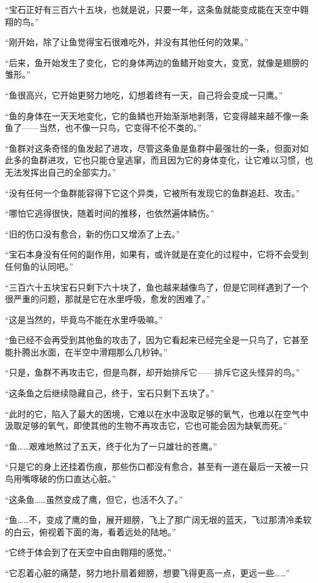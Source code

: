 “宝石正好有三百六十五块，也就是说，只要一年，这条鱼就能变成能在天空中翱翔的鸟。”

“刚开始，除了让鱼觉得宝石很难吃外，并没有其他任何的效果。”

“后来，鱼开始发生了变化，它的身体两边的鱼鳍开始变大，变宽，就像是翅膀的雏形。”

“鱼很高兴，它开始更努力地吃，幻想着终有一天，自己将会变成一只鹰。”

“鱼的身体在一天天地变化，它的鱼鳞也开始渐渐地剥落，它变得越来越不像一条鱼了——当然，也不像一只鸟，它变得不伦不类的。”

“鱼群对这条奇怪的鱼发起了进攻，尽管这条鱼是鱼群中最强壮的一条，但面对如此多的鱼群进攻，它也只能仓皇逃窜，而且因为它的身体变化，让它难以习惯，也无法发挥出自己的全部实力。”

“没有任何一个鱼群能容得下它这个异类，它被所有发现它的鱼群追赶、攻击。”

“哪怕它逃得很快，随着时间的推移，也依然遍体鳞伤。”

“旧的伤口没有愈合，新的伤口又增添了上去。”

“宝石本身没有任何的副作用，如果有，或许就是在变化的过程中，它将不会受到任何鱼的认同吧。”

“三百六十五块宝石只剩下六十块了，鱼也越来越像鸟了，但是它同样遇到了一个很严重的问题，那就是它在水里呼吸，愈发的困难了。”

“这是当然的，毕竟鸟不能在水里呼吸嘛。”

“鱼已经不会再受到其他鱼的攻击了，因为它看起来已经完全是一只鸟了，它甚至能扑腾出水面，在半空中滑翔那么几秒钟。”

“只是，鱼群不再攻击它，但是鸟群，却开始排斥它——排斥它这头怪异的鸟。”

“这条鱼之后继续隐藏自己，终于，宝石只剩下五块了。”

“此时的它，陷入了最大的困境，它难以在水中汲取足够的氧气，也难以在空气中汲取足够的氧气，即使其他的生物不再攻击它，它也可能会因为缺氧而死。”

“鱼……艰难地熬过了五天，终于化为了一只雄壮的苍鹰。”

“只是它的身上还挂着伤痕，那些伤口都没有愈合，甚至有一道在最后一天被一只鸟用嘴啄破的伤口直达心脏。”

“这条鱼……虽然变成了鹰，但它，也活不久了。”

“鱼……不，变成了鹰的鱼，展开翅膀，飞上了那广阔无垠的蓝天，飞过那清冷柔软的白云，俯视着下面的海，看着远处的陆地。”

“它终于体会到了在天空中自由翱翔的感觉。”

“它忍着心脏的痛楚，努力地扑扇着翅膀，想要飞得更高一点，更远一些……”

